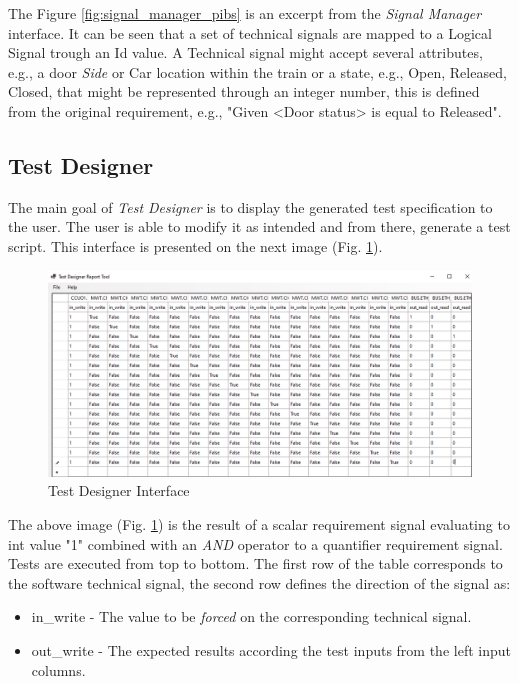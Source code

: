 The Figure \ref{fig:signal_manager_pibs} is an excerpt from the \textit{Signal Manager} interface. It can be seen that a set of technical signals are mapped to a Logical Signal trough an Id value. A Technical signal might accept several attributes, e.g., a door \textit{Side} or Car location within the train or a state, e.g., Open, Released, Closed, that might be represented through an integer number, this is defined from the original requirement, e.g., "Given <Door status> is equal to Released".


\subsection{Test Designer}
\label{subsec:test_designer}

The main goal of \textit{Test Designer} is to display the generated test specification to the user. The user is able to modify it as intended and from there, generate a test script. This interface is presented on the next image (Fig. \ref{fig:test_designer_interface}).

\begin{figure}[H]
    \centering
    \includegraphics[width=\textwidth]{images/test_designer.PNG}
    \caption{Test Designer Interface}
    \label{fig:test_designer_interface}
\end{figure}

The above image (Fig. \ref{fig:test_designer_interface}) is the result of a scalar requirement signal evaluating to int value "1" combined with an \textit{AND} operator to a quantifier requirement signal. Tests are executed from top to bottom.
The first row of the table corresponds to the software technical signal, the second row defines the direction of the signal as:

\begin{itemize}
    \item in\_write - The value to be \textit{forced} on the corresponding technical signal.
    \item out\_write - The expected results according the test inputs from the left input columns.
\end{itemize}



